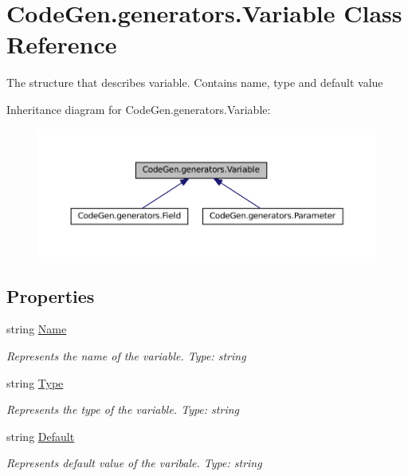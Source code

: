 \hypertarget{classCodeGen_1_1generators_1_1Variable}{}\section{Code\+Gen.\+generators.\+Variable Class Reference}
\label{classCodeGen_1_1generators_1_1Variable}


The structure that describes variable. Contains name, type and default value  




Inheritance diagram for Code\+Gen.\+generators.\+Variable\+:
\nopagebreak
\begin{figure}[H]
\begin{center}
\leavevmode
\includegraphics[width=350pt]{classCodeGen_1_1generators_1_1Variable__inherit__graph}
\end{center}
\end{figure}
\subsection*{Properties}
\begin{DoxyCompactItemize}
\item 
string \mbox{\hyperlink{classCodeGen_1_1generators_1_1Variable_a6b02f8bef23931e0a98adb0ff6399aed}{Name}}
\begin{DoxyCompactList}\small\item\em Represents the name of the variable. Type\+: string \end{DoxyCompactList}\item 
string \mbox{\hyperlink{classCodeGen_1_1generators_1_1Variable_a42c04d2c0f45318b1fcf0fd8753bdbcf}{Type}}
\begin{DoxyCompactList}\small\item\em Represents the type of the variable. Type\+: string \end{DoxyCompactList}\item 
string \mbox{\hyperlink{classCodeGen_1_1generators_1_1Variable_a773fcfe6f0e77f96ab75279c5f8c2051}{Default}}
\begin{DoxyCompactList}\small\item\em Represents default value of the varibale. Type\+: string \end{DoxyCompactList}\end{DoxyCompactItemize}


